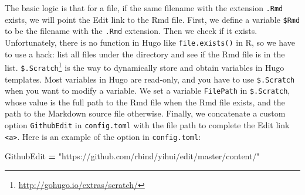 \documentclass[12pt,]{krantz}
\makeatletter
\newenvironment{Shaded}{\begin{snugshade}}{\end{snugshade}}
\newcommand{\KeywordTok}[1]{\textcolor[rgb]{0.13,0.29,0.53}{\textbf{#1}}}
\newcommand{\NormalTok}[1]{#1}
\newcommand{\OperatorTok}[1]{\textcolor[rgb]{0.81,0.36,0.00}{\textbf{#1}}}
\newcommand{\OtherTok}[1]{\textcolor[rgb]{0.56,0.35,0.01}{#1}}
\newcommand{\StringTok}[1]{\textcolor[rgb]{0.31,0.60,0.02}{#1}}
\renewcommand{\href}[2]{#2\footnote{\url{#1}}}
\newenvironment{kframe}{%
\medskip{}
\setlength{\fboxsep}{.8em}
 \def\at@end@of@kframe{}%
 \ifinner\ifhmode%
  \def\at@end@of@kframe{\end{minipage}}%
  \begin{minipage}{\columnwidth}%
 \fi\fi%
 \def\FrameCommand##1{\hskip\@totalleftmargin \hskip-\fboxsep
 \colorbox{shadecolor}{##1}\hskip-\fboxsep
     \hskip-\linewidth \hskip-\@totalleftmargin \hskip\columnwidth}%
 \MakeFramed {\advance\hsize-\width
   \@totalleftmargin\z@ \linewidth\hsize
   \@setminipage}}%
 {\par\unskip\endMakeFramed%
 \at@end@of@kframe}
\renewenvironment{Shaded}{\begin{kframe}}{\end{kframe}}
\theoremstyle{definition}
\theoremstyle{definition}
\theoremstyle{definition}
\theoremstyle{remark}
\makeatother
\begin{document}
\begin{itemize}
\begin{Shaded}
\end{Shaded}

  The basic logic is that for a file, if the same filename with the
  extension \texttt{.Rmd} exists, we will point the Edit link to the Rmd
  file. First, we define a variable \texttt{\$Rmd} to be the filename
  with the \texttt{.Rmd} extension. Then we check if it exists.
  Unfortunately, there is no function in Hugo like
  \texttt{file.exists()} in R, so we have to use a hack: list all files
  under the directory and see if the Rmd file is in the list.
  \href{http://gohugo.io/extras/scratch/}{\texttt{\$.Scratch}} is the
  way to dynamically store and obtain variables in Hugo templates. Most
  variables in Hugo are read-only, and you have to use
  \texttt{\$.Scratch} when you want to modify a variable. We set a
  variable \texttt{FilePath} in \texttt{\$.Scratch}, whose value is the
  full path to the Rmd file when the Rmd file exists, and the path to
  the Markdown source file otherwise. Finally, we concatenate a custom
  option \texttt{GithubEdit} in \texttt{config.toml} with the file path
  to complete the Edit link \texttt{\textless{}a\textgreater{}}. Here is
  an example of the option in \texttt{config.toml}:

\begin{Shaded}
\begin{Highlighting}[]
\NormalTok{[params]}
\NormalTok{  GithubEdit }\OperatorTok{=} \StringTok{"https://github.com/rbind/yihui/edit/master/content/"}
\end{Highlighting}
\end{Shaded}


\end{itemize}
\end{document}
